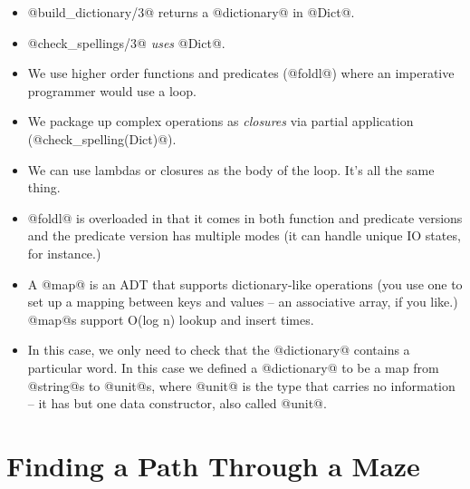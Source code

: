 \begin{itemize}
\item @build_dictionary/3@ returns a @dictionary@ in @Dict@.
\item @check_spellings/3@ \emph{uses} @Dict@.
\item We use higher order functions and predicates (@foldl@) where an
imperative programmer would use a loop.
\item We package up complex operations as \emph{closures} via partial
application (@check_spelling(Dict)@).
\item We can use lambdas or closures as the body of the loop.  It's all
the same thing.
\item @foldl@ is overloaded in that it comes in both function and
predicate versions and the predicate version has multiple modes (it can
handle unique IO states, for instance.)
\item A @map@ is an ADT that supports dictionary-like operations (you
use one to set up a mapping between keys and values -- an associative
array, if you like.)  @map@s support O(log n) lookup and insert times.
\item In this case, we only need to check that the @dictionary@ contains
a particular word.  In this case we defined a @dictionary@ to be a map
from @string@s to @unit@s, where @unit@ is the type that carries no
information -- it has but one data constructor, also called @unit@.
\end{itemize}



\section{Finding a Path Through a Maze}

